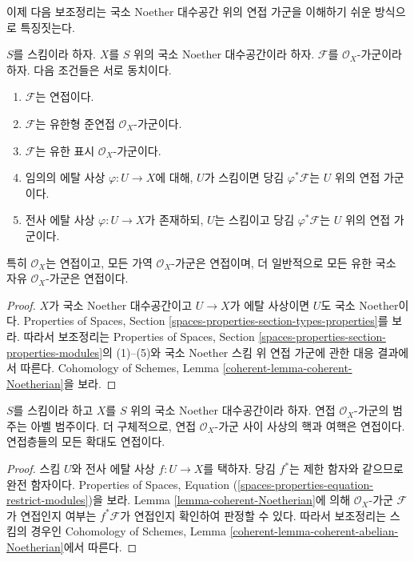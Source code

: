 \medskip\noindent
이제 다음 보조정리는 국소 Noether 대수공간 위의 연접 가군을
이해하기 쉬운 방식으로 특징짓는다.

\begin{lemma}
\label{lemma-coherent-Noetherian}
$S$를 스킴이라 하자. $X$를 $S$ 위의 국소 Noether 대수공간이라
하자. $\mathcal{F}$를 $\mathcal{O}_X$-가군이라 하자. 다음 조건들은
서로 동치이다.
\begin{enumerate}
\item $\mathcal{F}$는 연접이다.
\item $\mathcal{F}$는 유한형 준연접 $\mathcal{O}_X$-가군이다.
\item $\mathcal{F}$는 유한 표시 $\mathcal{O}_X$-가군이다.
\item 임의의 에탈 사상 $\varphi : U \to X$에 대해, $U$가 스킴이면
당김 $\varphi^*\mathcal{F}$는 $U$ 위의 연접 가군이다.
\item 전사 에탈 사상 $\varphi : U \to X$가 존재하되, $U$는 스킴이고
당김 $\varphi^*\mathcal{F}$는 $U$ 위의 연접 가군이다.
\end{enumerate}
특히 $\mathcal{O}_X$는 연접이고, 모든 가역 $\mathcal{O}_X$-가군은
연접이며, 더 일반적으로 모든 유한 국소 자유 $\mathcal{O}_X$-가군은
연접이다.
\end{lemma}

\begin{proof}
$X$가 국소 Noether 대수공간이고 $U \to X$가 에탈 사상이면
$U$도 국소 Noether이다. Properties of Spaces, Section
\ref{spaces-properties-section-types-properties}를 보라.
따라서 보조정리는 Properties of Spaces, Section
\ref{spaces-properties-section-properties-modules}의 (1)--(5)와 국소
Noether 스킴 위 연접 가군에 관한 대응 결과에서 따른다.
Cohomology of Schemes, Lemma
\ref{coherent-lemma-coherent-Noetherian}을 보라.
\end{proof}

\begin{lemma}
\label{lemma-coherent-abelian-Noetherian}
$S$를 스킴이라 하고 $X$를 $S$ 위의 국소 Noether 대수공간이라 하자.
연접 $\mathcal{O}_X$-가군의 범주는 아벨 범주이다. 더 구체적으로,
연접 $\mathcal{O}_X$-가군 사이 사상의 핵과 여핵은 연접이다.
연접층들의 모든 확대도 연접이다.
\end{lemma}

\begin{proof}
스킴 $U$와 전사 에탈 사상 $f : U \to X$를 택하자. 당김 $f^*$는
제한 함자와 같으므로 완전 함자이다. Properties of Spaces, Equation
(\ref{spaces-properties-equation-restrict-modules})을 보라.
Lemma \ref{lemma-coherent-Noetherian}에 의해 $\mathcal{O}_X$-가군
$\mathcal{F}$가 연접인지 여부는 $f^*\mathcal{F}$가 연접인지
확인하여 판정할 수 있다. 따라서 보조정리는 스킴의 경우인
Cohomology of Schemes, Lemma
\ref{coherent-lemma-coherent-abelian-Noetherian}에서 따른다.
\end{proof}

